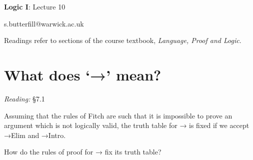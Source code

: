 \documentclass[12pt]{extarticle}
\date{}
\makeatletter
\def \ititle {Origins of Mind}
\def \isubtitle {Lecture 08}
\def \iemail{s.butterfill@warwick.ac.uk}
\makeatother
\begin{document}

\begin{multicols*}{3}

\setlength\footnotesep{1em}







\def \ititle {Logic I}
 
\def \isubtitle {Lecture 10}
 
\begin{center}
 
{\Large
 
\textbf{\ititle}: \isubtitle
 
}
 
 
 
\iemail %
 
\end{center}
 
Readings refer to sections of the course textbook, \emph{Language, Proof and Logic}.
 
 
 
\section{What does ‘→’ mean?}
 
\emph{Reading:} §7.1
 
Assuming that the rules of Fitch are such that it is impossible to prove an argument which is not logically valid, the truth table for → is fixed if we accept →Elim and →Intro.
 
How do the rules of proof for → fix its truth table?
 

\end{multicols*}
\end{document}
